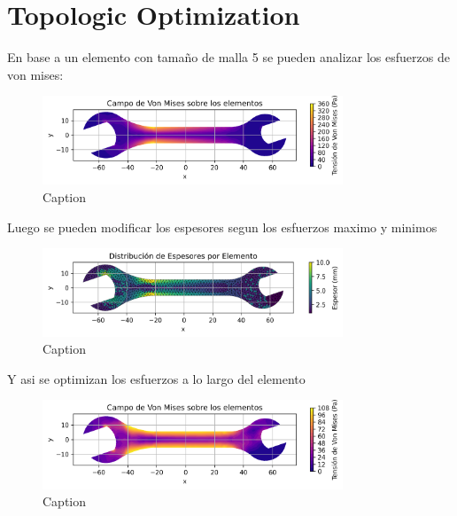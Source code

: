 \section{Topologic Optimization}

En base a un elemento con tamaño de malla 5 se pueden analizar los esfuerzos de von mises:

\begin{figure}[H]
  \centering
  \includegraphics[width=0.8\textwidth]{GRAFICOS/Topo_ini_von_mises.png}
  \caption{Caption}
  \label{fig:deformada_reacciones}
\end{figure}

Luego se pueden modificar los espesores segun los esfuerzos maximo y minimos

\begin{figure}[H]
  \centering
  \includegraphics[width=0.8\textwidth]{GRAFICOS/espesores_espesores.png}
  \caption{Caption}
  \label{fig:von_mises}
\end{figure}

Y asi se optimizan los esfuerzos a lo largo del elemento

\begin{figure}[H]
  \centering
  \includegraphics[width=0.8\textwidth]{GRAFICOS/Topo_von_mises.png}
  \caption{Caption}
  \label{fig:analisis_estructural}
\end{figure}

